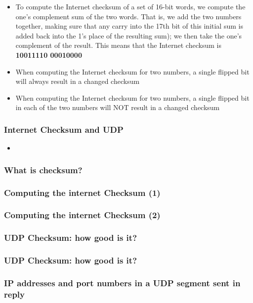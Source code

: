 \begin{itemize}
        \item[] To compute the Internet checksum of a set of 16-bit words, we compute the one's complement sum 
        of the two words. That is, we add the two numbers together, making sure that any carry into the 17th bit
        of this initial sum is added back into the 1's place of the resulting sum); we then take the one's
        complement of the result. This means that the Internet checksum is \textbf{10011110 00010000}
        \item When computing the Internet checksum for two numbers, a single flipped bit will always result in a 
        changed checksum
        \item When computing the Internet checksum for two numbers, a single flipped bit in each of the two numbers
        will NOT result in a changed checksum
    \end{itemize}

    \subsubsection*{Internet Checksum and UDP}
    \begin{itemize}
        \item 
    \end{itemize}

    \subsubsection*{What is checksum?}
    \subsubsection*{Computing the internet Checksum (1)}
    \subsubsection*{Computing the internet Checksum (2)}
    \subsubsection*{UDP Checksum: how good is it?}
    \subsubsection*{UDP Checksum: how good is it?}
    \subsubsection*{IP addresses and port numbers in a UDP segment sent in reply}


